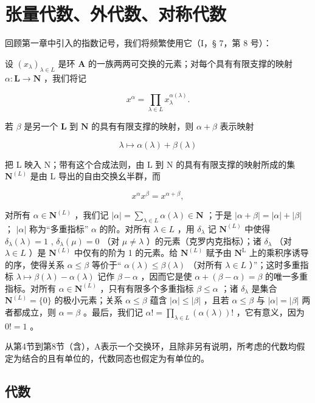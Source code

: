 \chapter{张量代数、外代数、对称代数}

回顾第一章中引入的指数记号，我们将频繁使用它（I，§ 7，第 8 号）：

设 \((x_{\lambda})_{\lambda \in L}\) 是环 \(\mathbf{A}\) 的一族两两可交换的元素；对每个具有有限支撑的映射 \(\alpha: \mathbf{L} \to \mathbf{N}\) ，我们将记

\[
x ^ {\alpha} = \prod_ {\lambda \in L} x _ {\lambda} ^ {\alpha (\lambda)}.
\]

若 \(\beta\) 是另一个 \(\mathbf{L}\) 到 \(\mathbf{N}\) 的具有有限支撑的映射，则 \(\alpha + \beta\) 表示映射

\[
\lambda \mapsto \alpha (\lambda) + \beta (\lambda)
\]

把 L 映入 N；带有这个合成法则，由 L 到 N 的具有有限支撑的映射所成的集 \(\mathbf{N}^{(L)}\) 是由 L 导出的自由交换幺半群，而

\[
x ^ {\alpha} x ^ {\beta} = x ^ {\alpha + \beta},
\]

对所有 \(\alpha \in \mathbf{N}^{(L)}\) ，我们记 \(|\alpha| = \sum_{\lambda \in L} \alpha(\lambda) \in \mathbf{N}\) ；于是 \(|\alpha + \beta| = |\alpha| + |\beta|\) ； \(|\alpha|\) 称为“多重指标” \(\alpha\) 的阶。对所有 \(\lambda \in L\) ，用 \(\delta_{\lambda}\) 记 \(\mathbf{N}^{(L)}\) 中使得 \(\delta_{\lambda}(\lambda) = 1\) , \(\delta_{\lambda}(\mu) = 0\) （对 \(\mu \neq \lambda\) ）的元素（克罗内克指标）；诸 \(\delta_{\lambda}\) （对 \(\lambda \in L\) ）是 \(\mathbf{N}^{(L)}\) 中仅有的阶为 1 的元素。给 \(\mathbf{N}^{(L)}\) 赋予由 \(\mathbf{N}^{\mathrm{L}}\) 上的乘积序诱导的序，使得关系 \(\alpha \leqslant \beta\) 等价于“ \(\alpha(\lambda) \leqslant \beta(\lambda)\) （对所有 \(\lambda \in L\) ）”；这时多重指标 \(\lambda \mapsto \beta(\lambda) - \alpha(\lambda)\) 记作 \(\beta - \alpha\) ，因而它是使 \(\alpha + (\beta - \alpha) = \beta\) 的唯一多重指标。对所有 \(\alpha \in \mathbf{N}^{(L)}\) ，只有有限多个多重指标 \(\beta \leqslant \alpha\) ；诸 \(\delta_{\lambda}\) 是集合 \(\mathbf{N}^{(L)} = \{0\}\) 的极小元素；关系 \(\alpha \leqslant \beta\) 蕴含 \(|\alpha| \leqslant |\beta|\) ，且若 \(\alpha \leqslant \beta\) 与 \(|\alpha| = |\beta|\) 两者都成立，则 \(\alpha = \beta\) 。最后，我们记 \(\alpha! = \prod_{\lambda \in L} (\alpha(\lambda))!\) ，它有意义，因为 \(0! = 1\) 。

从第4节到第8节（含），A表示一个交换环，且除非另有说明，所考虑的代数均假定为结合的且有单位的，代数同态也假定为有单位的。

\section{代数}
